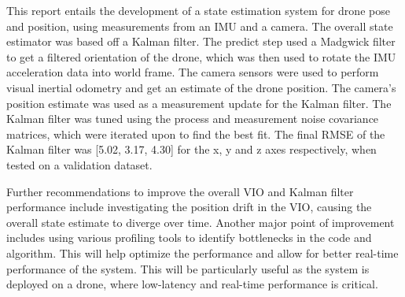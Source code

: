 \documentclass[bare_jrnl_transmag]{subfiles}
\begin{document}
This report entails the development of a state estimation system for drone pose and position, using measurements from an IMU and a camera. The overall state estimator was based off a Kalman filter. The predict step used a Madgwick filter to get a filtered orientation of the drone, which was then used to rotate the IMU acceleration data into world frame. The camera sensors were used to perform visual inertial odometry and get an estimate of the drone position. The camera's position estimate was used as a measurement update for the Kalman filter. The Kalman filter was tuned using the process and measurement noise covariance matrices, which were iterated upon to find the best fit. The final RMSE of the Kalman filter was [5.02, 3.17, 4.30] for the x, y and z axes respectively, when tested on a validation dataset. \newline

Further recommendations to improve the overall VIO and Kalman filter performance include investigating the position drift in the VIO, causing the overall state estimate to diverge over time. Another major point of improvement includes using various profiling tools to identify bottlenecks in the code and algorithm. This will help optimize the performance and allow for better real-time performance of the system. This will be particularly useful as the system is deployed on a drone, where low-latency and real-time performance is critical.
\end{document}
